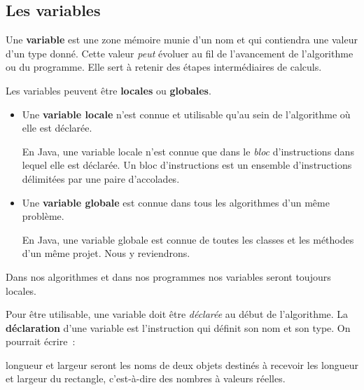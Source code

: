 		\subsection{Les variables}
		
			Une \textbf{variable} est une zone mémoire munie
			d'un nom et qui contiendra une valeur d’un type donné.  Cette valeur
			\emph{peut} évoluer au fil de l'avancement de l'algorithme ou du
			programme.  Elle sert à retenir des étapes intermédiaires de
			calculs.

			Les variables peuvent être \textbf{locales} ou \textbf{globales}.

			\begin{itemize}
				
				\item Une \textbf{variable locale} n'est
					connue et utilisable qu'au sein de l'algorithme où elle est
					déclarée. 

					En Java, une variable locale n'est connue que dans le
					\emph{bloc} d'instructions dans lequel elle est déclarée.
					Un bloc d'instructions  est un ensemble
					d'instructions délimitées par une paire d'accolades. 

				\item Une \textbf{variable globale} est 
					connue dans tous les algorithmes d'un même problème. 

					En Java, une variable globale est connue de toutes les
					classes et les méthodes d'un même projet. Nous y reviendrons. 

			\end{itemize}
				
			Dans nos algorithmes et dans nos programmes nos variables  seront
			toujours locales. 

			Pour être utilisable, une variable doit être \emph{déclarée} au
			début de l’algorithme. La \textbf{déclaration}
			d’une variable est l’instruction qui définit son nom et son type.
			On pourrait écrire~:
	
			\begin{pseudocode}
				\Stmt longueur et largeur seront les noms de deux 
				objets destinés à recevoir
				\Stmt les longueur et largeur du rectangle, 
				c’est-à-dire des nombres à valeurs réelles.
			\end{pseudocode}
			
